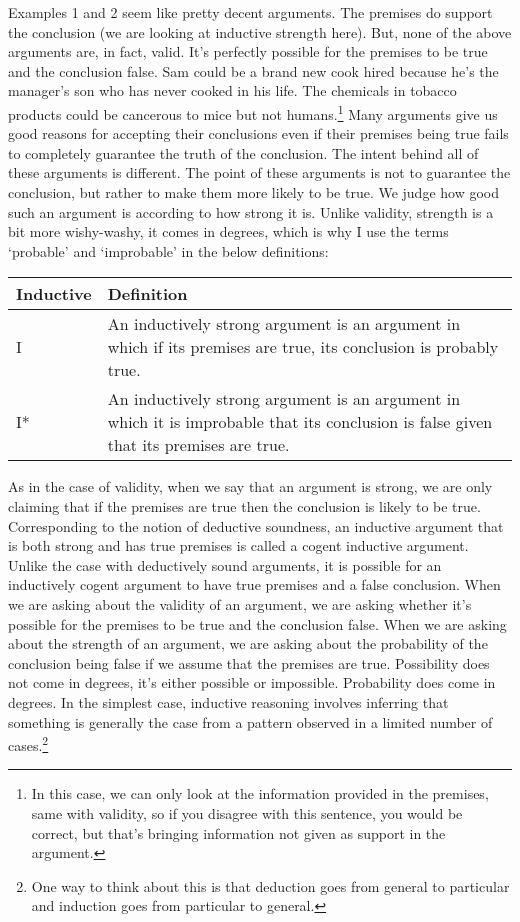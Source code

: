 Examples 1 and 2 seem like pretty decent arguments. The premises do support the conclusion (we are looking at inductive strength here). But, none of the above arguments are, in fact, valid. It's perfectly possible for the premises to be true and the conclusion false. Sam could be a brand new cook hired because he’s the manager’s son who has never cooked in his life. The chemicals in tobacco products could be cancerous to mice but not humans.\footnote{In this case, we can only look at the information provided in the premises, same with validity, so if you disagree with this sentence, you would be correct, but that's bringing information not given as support in the argument.} Many arguments give us good reasons for accepting their conclusions even if their premises being true fails to completely guarantee the truth of the conclusion.  The intent behind all of these arguments is different. The point of these arguments is not to guarantee the conclusion, but rather to make them more likely to be true.  We judge how good such an argument is according to how strong it is.  Unlike validity, strength is a bit more wishy-washy, it comes in degrees, which is why I use the terms `probable' and `improbable' in the below definitions:

\begin{tabular}{p{1in}|p{4.5in}}
Inductive&Definition\\\hline
I &An inductively strong argument is an argument in which if its premises are true, its conclusion is probably true.\\
I* &An inductively strong argument is an argument in which it is improbable that its conclusion is false given that its premises are true.
\end{tabular}

As in the case of validity, when we say that an argument is strong, we are only claiming that if the premises are true then the conclusion is likely to be true. Corresponding to the notion of deductive soundness, an inductive argument that is both strong and has true premises is called a cogent inductive argument. Unlike the case with deductively sound arguments, it is possible for an inductively cogent argument to have true premises and a false conclusion. When we are asking about the validity of an argument, we are asking whether it's possible for the premises to be true and the conclusion false. When we are asking about the strength of an argument, we are asking about the probability of the conclusion being false if we assume that the premises are true.  Possibility does not come in degrees, it's either possible or impossible. Probability does come in degrees. In the simplest case, inductive reasoning involves inferring that something is generally the case from a pattern observed in a limited number of cases.\footnote{One way to think about this is that deduction goes from general to particular and induction goes from particular to general.}

